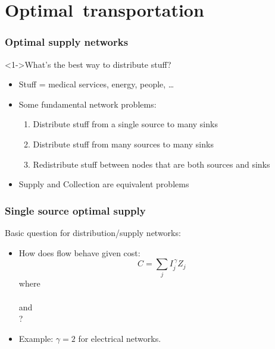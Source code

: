 
\section{Optimal\  transportation}

\begin{frame}
  \frametitle{Optimal supply networks}

  \begin{block}<1->{What's the best way to distribute stuff?}
    \begin{itemize}
    \item<2-> Stuff = medical services, energy, people, \ldots
    \item<3-> \alert{Some} fundamental network problems:
      \begin{enumerate}
      \item<4-> Distribute stuff from a \alert{single source} to
        \alert{many sinks}
      \item<5-> Distribute stuff from \alert{many sources} to
        many sinks
      \item<6-> \alert{Redistribute} stuff between nodes that
        are both sources and sinks
      \end{enumerate}
    \item<7-> Supply and Collection are equivalent problems
    \end{itemize}
  \end{block}
  
\end{frame}


\begin{frame}
  \frametitle{Single source optimal supply}

  \begin{block}{Basic question for distribution/supply networks:}
    \begin{itemize}
    \item<1->
      How does flow behave given cost:
      $$
      C 
      = 
      \sum_{j} I_j^{\, \gamma} Z_j
      $$
      where \\
      \\
      and\\
      ?
    \item<2->
      Example: $\gamma=2$ for electrical networks.
    \end{itemize}
  \end{block}
  
\end{frame}


